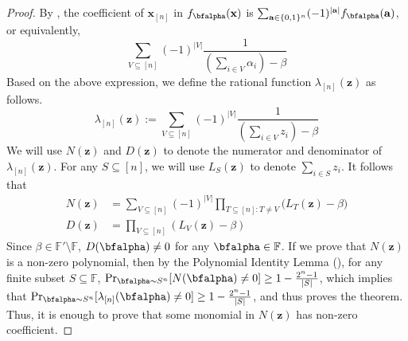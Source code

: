 \documentclass[11pt]{article}
\newcommand{\Boo}{\{0,1 \}}
\newcommand{\F}{\mathbb{F}}
\begin{document}
\begin{proof}
    By , the coefficient of $\mathbf{x}_{[n]}$ in $f_{\bfalpha}(\mathbf{x})$ is $\sum_{\mathbf{a}\in\Boo^n} (-1)^{|\mathbf{a}|}f_{\bfalpha}(\mathbf{a})$, or equivalently, $$\sum_{V \subseteq [n]} (-1)^{|V|}{\frac{1}{(\sum_{i \in V}\alpha_i) - \beta}}$$
    Based on the above expression, we define the rational function $\lambda_{[n]}(\mathbf{z})$ as follows. 
    $$\lambda_{[n]}(\mathbf{z}) := \sum_{V \subseteq [n]} (-1)^{|V|}{\frac{1}{(\sum_{i \in V}z_i) - \beta}}$$
    We will use $N(\mathbf{z})$ and $D(\mathbf{z})$ to denote the numerator and denominator of $\lambda_{[n]}(\mathbf{z})$. For any $S\subseteq [n]$, we will use $L_S(\mathbf{z})$ to denote $\sum_{i \in S}z_i$. It follows that 
    \begin{align*}
        N(\mathbf{z}) &= \sum_{V\subseteq [n]}{(-1)^{|V|}\prod_{T\subseteq [n]: T \neq V}({L_T(\mathbf{z})-\beta}}) \\
        D(\mathbf{z}) &= \prod_{V \subseteq [n]}{(L_V(\mathbf{z})-\beta)}
    \end{align*}
    Since $\beta \in \F'\setminus \F$, $D(\bfalpha) \neq 0$ for any $\bfalpha \in \F$. If we prove that $N(\mathbf{z})$ is a non-zero polynomial, then by the Polynomial Identity Lemma (), for any finite subset $S\subseteq \F$, $\Pr_{\bfalpha \sim S^n}[N(\bfalpha) \neq 0] \geq 1 - \frac{2^n - 1}{|S|}$, which implies that $\Pr_{\bfalpha \sim S^n}[\lambda_{[n]}(\bfalpha) \neq 0] \geq 1 - \frac{2^n - 1}{|S|}$, and thus proves the theorem. Thus, it is enough to prove that some monomial in $N(\mathbf{z})$ has non-zero coefficient.
    

\end{proof}
\end{document}
